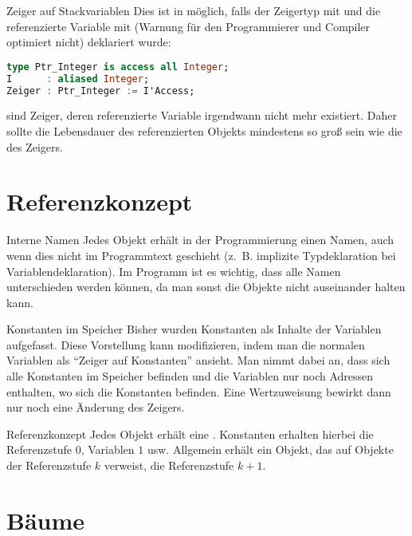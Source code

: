 \begin{Def}{Zeiger auf Stackvariablen}
    Dies ist in \Ada{} möglich, falls der Zeigertyp mit  und die
    referenzierte Variable mit  (Warnung für den Programmierer
    und Compiler optimiert nicht)
    deklariert wurde:

\begin{lstlisting}[language=ada]
type Ptr_Integer is access all Integer;
I      : aliased Integer;
Zeiger : Ptr_Integer := I'Access;
\end{lstlisting}

     sind Zeiger, deren referenzierte Variable
    irgendwann nicht mehr existiert. Daher sollte die Lebensdauer des
    referenzierten Objekts mindestens so groß sein wie die des Zeigers.
\end{Def}

\section{%
    Referenzkonzept%
}

\begin{Def}{Interne Namen}
    Jedes Objekt erhält in der Programmierung einen Namen, auch wenn dies nicht
    im Programmtext geschieht (z.~B. implizite Typdeklaration bei
    Variablendeklaration).
    Im Programm ist es wichtig, dass alle Namen unterschieden werden können,
    da man sonst die Objekte nicht auseinander halten kann.
\end{Def}

\begin{Def}{Konstanten im Speicher}
    Bisher wurden Konstanten als Inhalte der Variablen aufgefasst.
    Diese Vorstellung kann modifizieren, indem man die normalen Variablen als
    "`Zeiger auf Konstanten"' ansieht.
    Man nimmt dabei an, dass sich alle Konstanten im Speicher befinden und die
    Variablen nur noch Adressen enthalten, wo sich die Konstanten befinden.
    Eine Wertzuweisung bewirkt dann nur noch eine Änderung des Zeigers.
\end{Def}

\begin{Def}{Referenzkonzept}
    Jedes Objekt erhält eine .
    Konstanten erhalten hierbei die Referenzstufe $0$, Variablen $1$ usw.
    Allgemein erhält ein Objekt, das auf Objekte der Referenzstufe $k$
    verweist, die Referenzstufe $k + 1$.
\end{Def}

\section{%
    Bäume%
}

